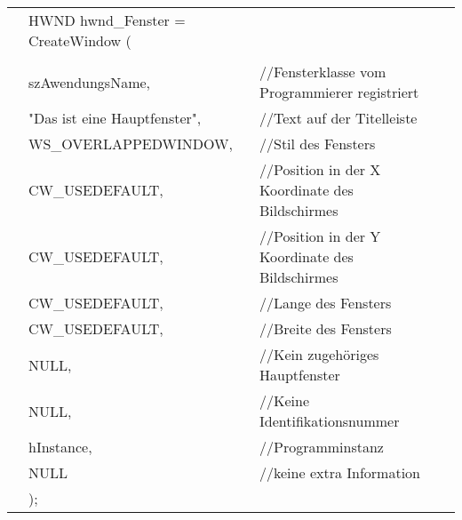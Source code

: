\begin{tabular}{llll}
& HWND hwnd\_Fenster = CreateWindow (\\
\\
& szAwendungsName,					& //Fensterklasse vom Programmierer registriert\\                            
& "Das ist eine Hauptfenster",  	& //Text auf der Titelleiste\\                                
& WS\_OVERLAPPEDWINDOW,              & //Stil des Fensters\\                         
& CW\_USEDEFAULT,                    & //Position in der X Koordinate des Bildschirmes\\     
& CW\_USEDEFAULT,                    & //Position in der Y Koordinate des Bildschirmes\\     
& CW\_USEDEFAULT,                    & //Lange des Fensters\\                                  
& CW\_USEDEFAULT,                    & //Breite des Fensters\\                                 
& NULL,                              & //Kein zugehöriges Hauptfenster\\                           
& NULL,                              & //Keine Identifikationsnummer\\                               
& hInstance,                         & //Programminstanz\\                                 
& NULL                               & //keine extra Information\\  
& );                          
\end{tabular}                        

